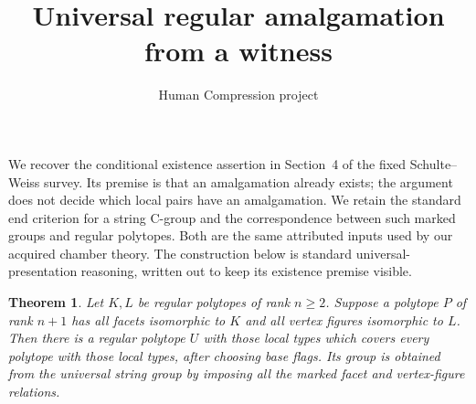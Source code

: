 \documentclass[11pt,a4paper]{article}
\title{Universal regular amalgamation from a witness}
\author{Human Compression project}\date{}
\newtheorem{theorem}{Theorem}
\begin{document}
\maketitle
We recover the conditional existence assertion in Section~4 of the fixed
Schulte--Weiss survey. Its premise is that an amalgamation already exists;
the argument does not decide which local pairs have an amalgamation.
We retain the standard end criterion for a string C-group and the
correspondence between such marked groups and regular polytopes.
Both are the same attributed inputs used by our acquired chamber theory.
The construction below is standard universal-presentation reasoning,
written out to keep its existence premise visible.

\begin{theorem}
Let $K,L$ be regular polytopes of rank $n\geq2$. Suppose a polytope $P$
of rank $n+1$ has all facets isomorphic to $K$ and all vertex figures
isomorphic to $L$. Then there is a regular polytope $U$ with those local
types which covers every polytope with those local types, after choosing
base flags. Its group is obtained from the universal string group by
imposing all the marked facet and vertex-figure relations.
\end{theorem}
\end{document}
